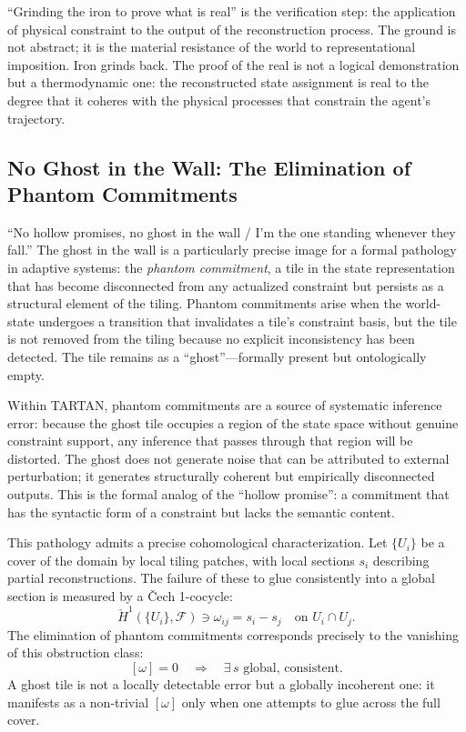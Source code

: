 \documentclass[12pt, a4paper]{article}
\begin{document}
``Grinding the iron to prove what is real'' is the verification step: the application of physical constraint to the output of the reconstruction process. The ground is not abstract; it is the material resistance of the world to representational imposition. Iron grinds back. The proof of the real is not a logical demonstration but a thermodynamic one: the reconstructed state assignment is real to the degree that it coheres with the physical processes that constrain the agent's trajectory.

\subsection{No Ghost in the Wall: The Elimination of Phantom Commitments}

``No hollow promises, no ghost in the wall / I'm the one standing whenever they fall.'' The ghost in the wall is a particularly precise image for a formal pathology in adaptive systems: the \textit{phantom commitment}, a tile in the state representation that has become disconnected from any actualized constraint but persists as a structural element of the tiling. Phantom commitments arise when the world-state undergoes a transition that invalidates a tile's constraint basis, but the tile is not removed from the tiling because no explicit inconsistency has been detected. The tile remains as a ``ghost''---formally present but ontologically empty.

Within TARTAN, phantom commitments are a source of systematic inference error: because the ghost tile occupies a region of the state space without genuine constraint support, any inference that passes through that region will be distorted. The ghost does not generate noise that can be attributed to external perturbation; it generates structurally coherent but empirically disconnected outputs. This is the formal analog of the ``hollow promise'': a commitment that has the syntactic form of a constraint but lacks the semantic content.

This pathology admits a precise cohomological characterization. Let $\{U_i\}$ be a cover of the domain by local tiling patches, with local sections $s_i$ describing partial reconstructions. The failure of these to glue consistently into a global section is measured by a \v{C}ech 1-cocycle:
\[
\check{H}^1(\{U_i\}, \mathcal{F}) \ni \omega_{ij} = s_i - s_j \quad \text{on } U_i \cap U_j.
\]
The elimination of phantom commitments corresponds precisely to the vanishing of this obstruction class:
\[
[\omega] = 0 \quad \Longrightarrow \quad \exists\, s \text{ global, consistent.}
\]
A ghost tile is not a locally detectable error but a globally incoherent one: it manifests as a non-trivial $[\omega]$ only when one attempts to glue across the full cover.
\end{document}
